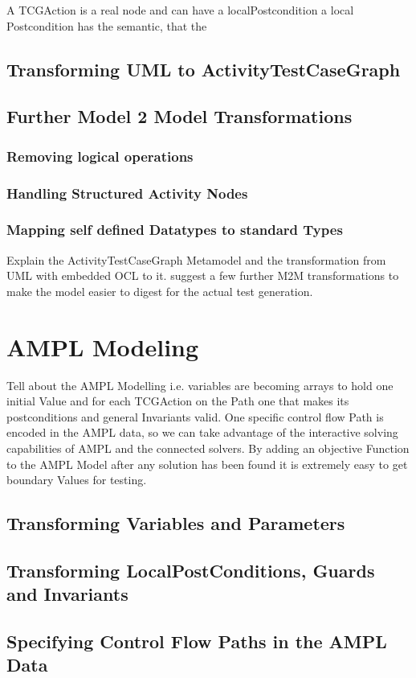 A TCGAction is a real node and can have a localPostcondition a local Postcondition has the semantic, that the 

\subsection{Transforming UML to ActivityTestCaseGraph}
\subsection{Further Model 2 Model Transformations}
\subsubsection{Removing logical operations}
\subsubsection{Handling Structured Activity Nodes}
\subsubsection{Mapping self defined Datatypes to standard Types}
Explain the ActivityTestCaseGraph Metamodel and the transformation from UML with embedded OCL to it. 
suggest a few further M2M transformations to make the model easier to digest for the actual test generation.
\section{AMPL Modeling}
Tell about the AMPL Modelling i.e. variables are becoming arrays to hold one initial Value and for each TCGAction on the Path one that makes its postconditions and general Invariants valid. One specific control flow Path is encoded in the AMPL data, so we can take advantage of the interactive solving capabilities of AMPL and the connected solvers.
By adding an objective Function to the AMPL Model after any solution has been found it is extremely easy to get boundary Values for testing.
\subsection{Transforming Variables and Parameters}
\subsection{Transforming LocalPostConditions, Guards and Invariants}
\subsection{Specifying Control Flow Paths in the AMPL Data}

